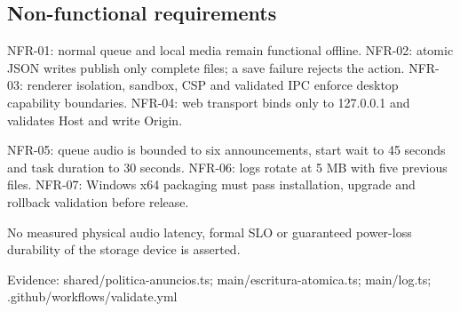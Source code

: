 \subsection{Non-functional requirements}

NFR-01: normal queue and local media remain functional offline. NFR-02: atomic JSON writes publish only complete files; a save failure rejects the action. NFR-03: renderer isolation, sandbox, CSP and validated IPC enforce desktop capability boundaries. NFR-04: web transport binds only to 127.0.0.1 and validates Host and write Origin.

NFR-05: queue audio is bounded to six announcements, start wait to 45 seconds and task duration to 30 seconds. NFR-06: logs rotate at 5 MB with five previous files. NFR-07: Windows x64 packaging must pass installation, upgrade and rollback validation before release.

No measured physical audio latency, formal SLO or guaranteed power-loss durability of the storage device is asserted.

Evidence: shared/politica-anuncios.ts; main/escritura-atomica.ts; main/log.ts; .github/workflows/validate.yml
